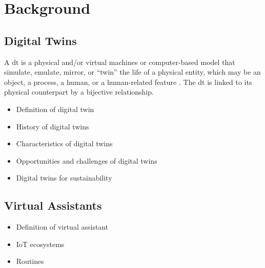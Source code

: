 \chapter{Background}\label{ch:background}

\section{Digital Twins}

A \acrfull{dt} is a physical and/or virtual machines or computer-based model that simulate, emulate, mirror, or ``twin'' the life of a physical entity, which may be an object, a process, a human, or a human-related feature \parencite{barricelliMultiModalApproachCreating2022}. The \acrshort{dt} is linked to its physical counterpart by a bijective relationship.

\begin{itemize}
    \item Definition of digital twin
    \item History of digital twins
    \item Characteristics of digital twins
    \item Opportunities and challenges of digital twins
    \item Digital twins for sustainability
\end{itemize}

\section{Virtual Assistants}

\begin{itemize}
    \item Definition of virtual assistant
    \item IoT ecosystems
    \item Routines
\end{itemize}